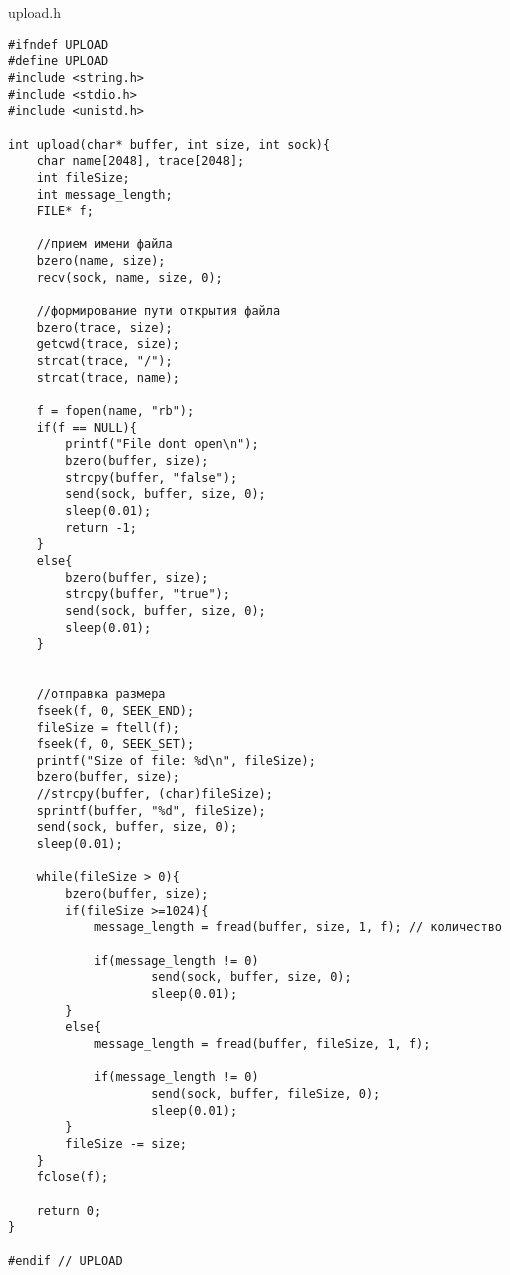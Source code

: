 \documentclass[12pt,a4paper]{report}
\begin{document}
upload.h
\begin{lstlisting}
#ifndef UPLOAD
#define UPLOAD
#include <string.h>
#include <stdio.h>
#include <unistd.h>

int upload(char* buffer, int size, int sock){
    char name[2048], trace[2048];
    int fileSize;
    int message_length;
    FILE* f;

    //прием имени файла
    bzero(name, size);
    recv(sock, name, size, 0);

    //формирование пути открытия файла
    bzero(trace, size);
    getcwd(trace, size);
    strcat(trace, "/");
    strcat(trace, name);

    f = fopen(name, "rb");
    if(f == NULL){
        printf("File dont open\n");
        bzero(buffer, size);
        strcpy(buffer, "false");
        send(sock, buffer, size, 0);
        sleep(0.01);
        return -1;
    }
    else{
        bzero(buffer, size);
        strcpy(buffer, "true");
        send(sock, buffer, size, 0);
        sleep(0.01);
    }


    //отправка размера
    fseek(f, 0, SEEK_END);
    fileSize = ftell(f);
    fseek(f, 0, SEEK_SET);
    printf("Size of file: %d\n", fileSize);
    bzero(buffer, size);
    //strcpy(buffer, (char)fileSize);
    sprintf(buffer, "%d", fileSize);
    send(sock, buffer, size, 0);
    sleep(0.01);

    while(fileSize > 0){
        bzero(buffer, size);
        if(fileSize >=1024){
            message_length = fread(buffer, size, 1, f); // количество

            if(message_length != 0)
                    send(sock, buffer, size, 0);
                    sleep(0.01);
        }
        else{
            message_length = fread(buffer, fileSize, 1, f);

            if(message_length != 0)
                    send(sock, buffer, fileSize, 0);
                    sleep(0.01);
        }
        fileSize -= size;
    }
    fclose(f);

    return 0;
}

#endif // UPLOAD
\end{lstlisting}
\end{document}
